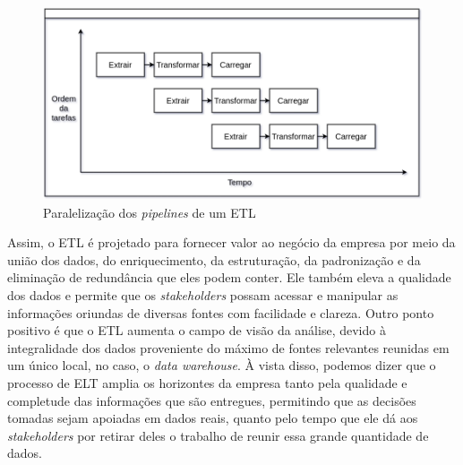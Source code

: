 \begin{figure}[ht]
\centering
\includegraphics[width=1\textwidth]{imagens/pipeline-funcoes-ETL.png}
\caption{Paralelização dos \textit{pipelines} de um ETL}
\label{fig:pipelineETL}
\end{figure}

Assim, o ETL é projetado para fornecer valor ao negócio da empresa por meio da união dos dados, do enriquecimento, da estruturação, da padronização e da eliminação de redundância que eles podem conter. Ele também eleva a qualidade dos dados e permite que os \textit{stakeholders} possam acessar e manipular as informações oriundas de diversas fontes com facilidade e clareza. Outro ponto positivo é que o ETL aumenta o campo de visão da análise, devido à integralidade dos dados proveniente do máximo de fontes relevantes reunidas em um único local, no caso, o \textit{data warehouse}. À vista disso, podemos dizer que o processo de ELT amplia os horizontes da empresa tanto pela qualidade e completude das informações que são entregues, permitindo que as decisões tomadas sejam apoiadas em dados reais, quanto pelo tempo que ele dá aos \textit{stakeholders} por retirar deles o trabalho de reunir essa grande quantidade de dados.
